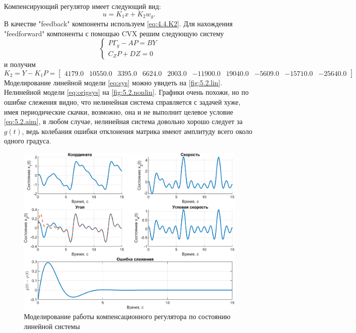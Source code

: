 Компенсирующий регулятор имеет следующий вид:
\begin{equation}
    \label{eq:5.2.reg}
    u=K_1x+K_2w_g.
\end{equation}
В качестве "feedback" компоненты используем \eqref{eq:4.4.K2}.
Для нахождения "feedforward" компоненты с помощью CVX решим следующую систему
\begin{equation*}
    \begin{cases}
        P\Gamma_g-AP=BY\\
        C_ZP+DZ=0
    \end{cases}
\end{equation*}
и получим
\begin{equation*}
    K_2=Y-K_1P=\begin{bmatrix}
4179.0 & 10550.0 & 3395.0 & 6624.0 & 2003.0 & -11900.0 & 19040.0 & -5609.0 & -15710.0 & -25640.0
    \end{bmatrix}
\end{equation*}
Моделирование линейной модели \eqref{eq:sys} можно увидеть на 
\autoref{fig:5.2.lin}. Нелинейной модели \eqref{eq:origsys} на
\autoref{fig:5.2.nonlin}. Графики очень похожи, но по ошибке слежения
видно, что нелинейная система справляется с задачей хуже, имея
периодические скачки, возможно, она и не выполнит целевое условие 
\eqref{eq:5.2.aim}, в любом случае, нелинейная система довольно хорошо
следует за $g(t)$, ведь колебания ошибки отклонения матрика имеют амплитуду 
всего около одного градуса.
\begin{figure}[H]
    \centering
    \includegraphics[width=\linewidth]{figs/5.2.lin.png}
    \caption{Моделирование работы компенсационного регулятора по состоянию
    линейной системы}
    \label{fig:5.2.lin}
\end{figure}
